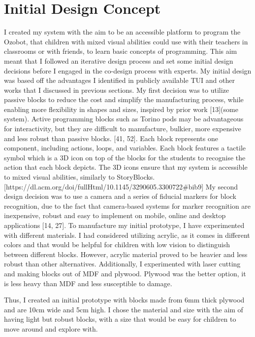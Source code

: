 \documentclass[oneside,%
                    author={Malak Hajji},
                    degree={BSc},
                    title={Designing An Accessible Computational Toolkit For Students},
                  subtitle={With Mixed Visual Abilities}]{dissertation}
\begin{document}
\section{Initial Design Concept}
I created my system with the aim to be an accessible platform to program the Ozobot, that children with mixed visual abilities could use with their teachers in classrooms or with friends, to learn basic concepts of programming. This aim meant that I followed an iterative design process and set some initial design decisions before I engaged in the co-design process with experts. My initial design was based off the advantages I identified in publicly available TUI and other works that I discussed in previous sections.
My first decision was to utilize passive blocks to reduce the cost and simplify the manufacturing process, while enabling more flexibility in shapes and sizes, inspired by prior work [13](some system).  Active programming blocks such as Torino pods may be advantageous for interactivity, but they are difficult to manufacture, bulkier, more expensive and less robust than passive blocks. [41, 52].  Each block represents one component, including actions, loops, and variables. Each block features a tactile symbol which is a 3D icon on top of the blocks for the students to recognise the action that each block depicts. The 3D icons  ensure that my system is accessible to mixed visual abilities, similarly to StoryBlocks.[https://dl.acm.org/doi/fullHtml/10.1145/3290605.3300722#bib9]
My second design decision was to use a camera and a series of fiducial markers for block recognition, due to the fact that camera-based systems for marker recognition are inexpensive, robust and easy to implement on mobile, online and desktop applications [14, 27].
To manufacture my initial prototype, I have experimented with different materials. I had considered utilizing acrylic, as it comes in different colors and that would be helpful for children with low vision to distinguish between different blocks. However, acrylic material proved to be heavier and less robust than other alternatives. Additionally, I experimented with laser cutting and making blocks out of MDF and plywood. Plywood was the better option, it is less heavy than MDF and less susceptible to damage. 

Thus, I created an initial prototype with blocks made from 6mm thick plywood and are 10cm wide and 5cm high. I chose the material and size with the aim of having light but robust blocks, with a size that would be easy for children to move around and explore with.
\end{document}
